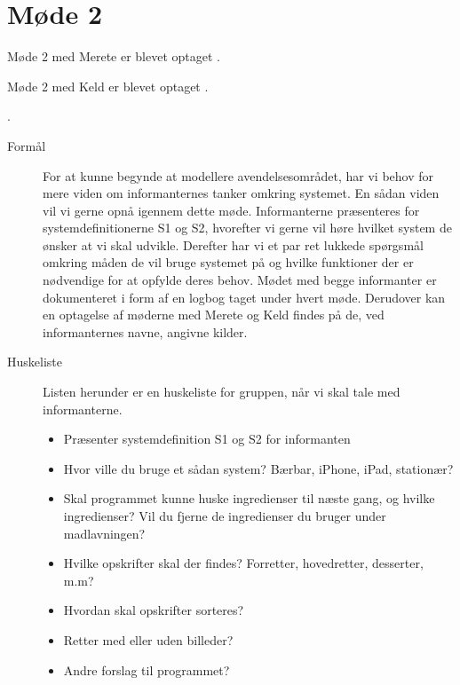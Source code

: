 \section{Møde 2}

Møde 2 med Merete er blevet optaget \cite{moede2merete}.

Møde 2 med Keld er blevet optaget \cite{moede2keld}.

\cite{moede1merete}.

\begin{description}

\item[Formål]
For at kunne begynde at modellere avendelsesområdet, har vi behov for mere viden om informanternes tanker omkring systemet. En sådan viden vil vi gerne opnå igennem dette møde. Informanterne præsenteres for systemdefinitionerne S1 og S2, hvorefter vi gerne vil høre hvilket system de ønsker at vi skal udvikle. Derefter har vi et par ret lukkede spørgsmål omkring måden de vil bruge systemet på og hvilke funktioner der er nødvendige for at opfylde deres behov.
Mødet med begge informanter er dokumenteret i form af en logbog taget under hvert møde. Derudover kan en optagelse af møderne med Merete\cite{moede2merete} og Keld\cite{moede1keld} findes på de, ved informanternes navne, angivne kilder.

\item[Huskeliste] Listen herunder er en huskeliste for gruppen, når vi skal tale med informanterne.

\begin{itemize}[noitemsep]
\item Præsenter systemdefinition S1 og S2 for informanten
\item Hvor ville du bruge et sådan system? Bærbar, iPhone, iPad, stationær?
\item Skal programmet kunne huske ingredienser til næste gang, og hvilke ingredienser? Vil du fjerne de ingredienser du bruger under madlavningen?
\item Hvilke opskrifter skal der findes? Forretter, hovedretter, desserter, m.m?
\item Hvordan skal opskrifter sorteres?
\item Retter med eller uden billeder?
\item Andre forslag til programmet?
\end{itemize}


\end{description}
